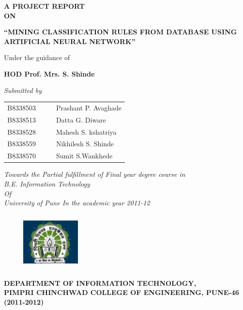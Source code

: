 \begin{titlepage}
\begin{center}
\Large{\bf{A PROJECT REPORT\\}}		%
\Large{\bf{ON\\}}		%
\begin{center}\color{blue}
\LARGE{\bf{ ``MINING CLASSIFICATION RULES FROM DATABASE USING ARTIFICIAL NEURAL NETWORK''\\}}	%
\end{center}
\Large{Under the guidance of\\ }\begin{center}\color{red}
\Large{\bf{HOD Prof. Mrs. S. Shinde}\\}\end{center}
\vspace{8pt}
\Large{\em{Submitted by\\}}
\begin{table}[htbp]
	\begin{center}
    \color{red}
	\begin{tabular}{ l c c l }
	\Large{B8338503} & & & \Large{Prashant  P. Avaghade} \\ 
	\Large{B8338513} & & & \Large{Datta G. Diware} \\
	\Large{B8338528} & & & \Large{Mahesh S. kshatriya} \\
	\Large{B8338559} & & & \Large{Nikhilesh S. Shinde} \\
      \Large{B8338570} & & & \Large{Sumit S.Wankhede} \\
	\end{tabular}
	\end{center}
	\end{table}
\Large{\em{Towards the Partial fulfillment of
Final year degree course in\\B.E. Information Technology\\
Of\\University of Pune
In the academic year
2011-12
\\}}
\vspace{3pt}
\vspace{10pt}
\begin{figure}[h]
\centering
\includegraphics[width=3cm,height=3cm]{pccoelogo.jpg}
\end{figure}
\Large{\bf{DEPARTMENT OF INFORMATION TECHNOLOGY,\\ 
PIMPRI CHINCHWAD COLLEGE OF ENGINEERING, PUNE-46}}
\vfill
\large\bf{(2011-2012)}
\end{center}
\end{titlepage}
